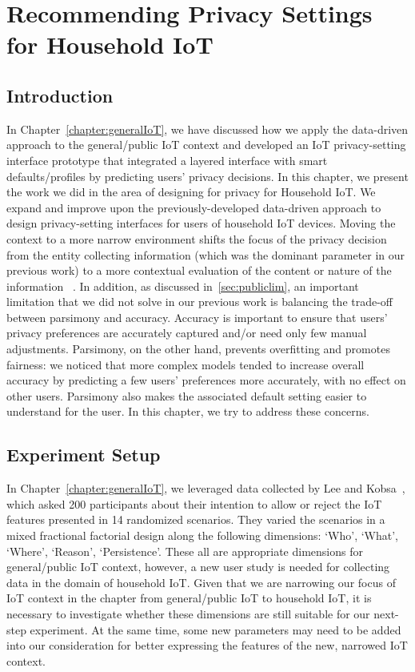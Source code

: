 \chapter{Recommending Privacy Settings for Household IoT}\label{chapter:householdIoT}

\section{Introduction}
In Chapter~\ref{chapter:generalIoT}, we have discussed how we apply the data-driven approach to the general/public IoT context and developed an IoT privacy-setting interface prototype that integrated a layered interface with smart defaults/profiles by predicting users' privacy decisions. In this chapter, we present the work we did in the area of designing for privacy for Household IoT. We expand and improve upon the previously-developed data-driven approach to design privacy-setting interfaces for users of household IoT devices. Moving the context to a more narrow environment shifts the focus of the privacy decision from the entity collecting information (which was the dominant parameter in our previous work) to a more contextual evaluation of the content or nature of the information ~\cite{nissenbaum_privacy_2004}. In addition, as discussed in~\ref{sec:publiclim}, an important limitation that we did not solve in our previous work is balancing the trade-off between parsimony and accuracy. Accuracy is important to ensure that users' privacy preferences are accurately captured and/or need only few manual adjustments. Parsimony, on the other hand, prevents overfitting and promotes fairness: we noticed that more complex models tended to increase overall accuracy by predicting a few users' preferences more accurately, with no effect on other users. Parsimony also makes the associated default setting easier to understand for the user. In this chapter, we try to address these concerns.

\section{Experiment Setup}\label{sec:exp_setup}
In Chapter~\ref{chapter:generalIoT}, we leveraged data collected by Lee and Kobsa~\cite{lee2016understanding}, which asked 200 participants about their intention to allow or reject the IoT features presented in 14 randomized scenarios. They varied the scenarios in a mixed fractional factorial design along the following dimensions: `Who', `What', `Where', `Reason', `Persistence'. These all are appropriate dimensions for general/public IoT context, however, a new user study is needed for collecting data in the domain of household IoT. Given that we are narrowing our focus of IoT context in the chapter from general/public IoT to household IoT, it is necessary to investigate whether these dimensions are still suitable for our next-step experiment. At the same time, some new parameters may need to be added into our consideration for better expressing the features of the new, narrowed IoT context. 

